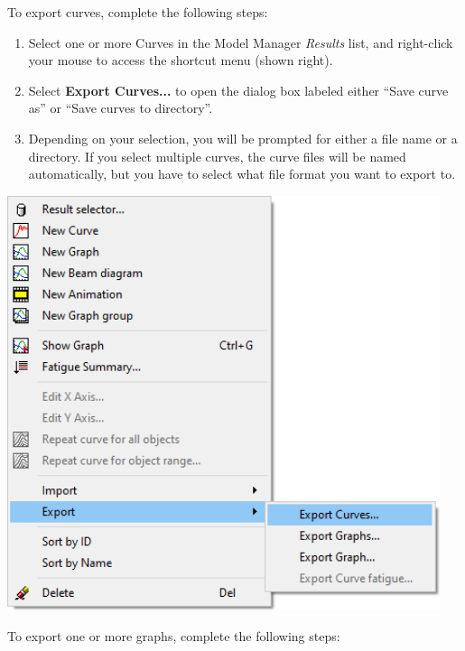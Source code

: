 
To export curves, complete the following steps:

\noindent
\begin{minipage}{0.5\textwidth}
  \raggedright
  \begin{enumerate}
  \item Select one or more Curves in the Model Manager {\sl Results} list,
    and right-click your mouse to access the shortcut menu (shown right).
  \item Select \textbf{Export Curves...} to open the dialog box labeled either
    ``Save curve as'' or ``Save curves to directory''.
  \item Depending on your selection, you will be prompted for either a
    file name or a directory.
    If you select multiple curves, the curve files will be named automatically,
    \newline but you have to select what file format you want to export to.
  \end{enumerate}
\end{minipage}%
\begin{minipage}{0.5\textwidth}
  \raggedleft
  \includegraphics[width=0.95\textwidth]{Figures/2-ExportCurves}
\end{minipage}

To export one or more graphs, complete the following steps:


